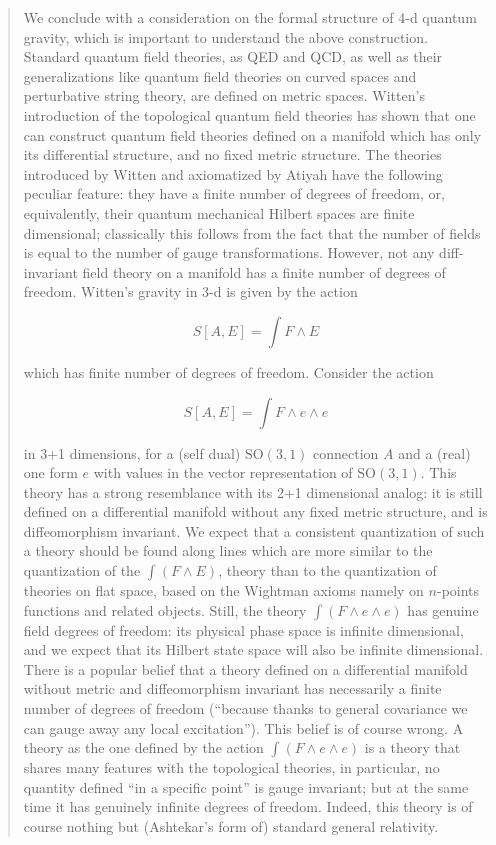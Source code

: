 \documentclass{article}
\begin{document}
\begin{quote}
We conclude with a consideration on the formal structure of 4-d quantum
gravity, which is important to understand the above construction.
Standard quantum field theories, as QED and QCD, as well as their
generalizations like quantum field theories on curved spaces and
perturbative string theory, are defined on metric spaces. Witten's
introduction of the topological quantum field theories has shown that
one can construct quantum field theories defined on a manifold which has
only its differential structure, and no fixed metric structure. The
theories introduced by Witten and axiomatized by Atiyah have the
following peculiar feature: they have a finite number of degrees of
freedom, or, equivalently, their quantum mechanical Hilbert spaces are
finite dimensional; classically this follows from the fact that the
number of fields is equal to the number of gauge transformations.
However, not any diff-invariant field theory on a manifold has a finite
number of degrees of freedom. Witten's gravity in 3-d is given by the
action

\[S[A,E] = \int F\wedge E \]

which has finite number of degrees of freedom. Consider the action

\[S[A,E] = \int F\wedge e\wedge e \]

in 3+1 dimensions, for a (self dual) \(\mathrm{SO}(3,1)\) connection
\(A\) and a (real) one form \(e\) with values in the vector
representation of \(\mathrm{SO}(3,1)\). This theory has a strong
resemblance with its 2+1 dimensional analog: it is still defined on a
differential manifold without any fixed metric structure, and is
diffeomorphism invariant. We expect that a consistent quantization of
such a theory should be found along lines which are more similar to the
quantization of the \(\int(F\wedge E)\), theory than to the quantization
of theories on flat space, based on the Wightman axioms namely on
\(n\)-points functions and related objects. Still, the theory
\(\int(F\wedge e\wedge e)\) has genuine field degrees of freedom: its
physical phase space is infinite dimensional, and we expect that its
Hilbert state space will also be infinite dimensional. There is a
popular belief that a theory defined on a differential manifold without
metric and diffeomorphism invariant has necessarily a finite number of
degrees of freedom (``because thanks to general covariance we can gauge
away any local excitation''). This belief is of course wrong. A theory
as the one defined by the action \(\int(F\wedge e\wedge e)\) is a theory
that shares many features with the topological theories, in particular,
no quantity defined ``in a specific point'' is gauge invariant; but at
the same time it has genuinely infinite degrees of freedom. Indeed, this
theory is of course nothing but (Ashtekar's form of) standard general
relativity.


\end{quote}
\end{document}
